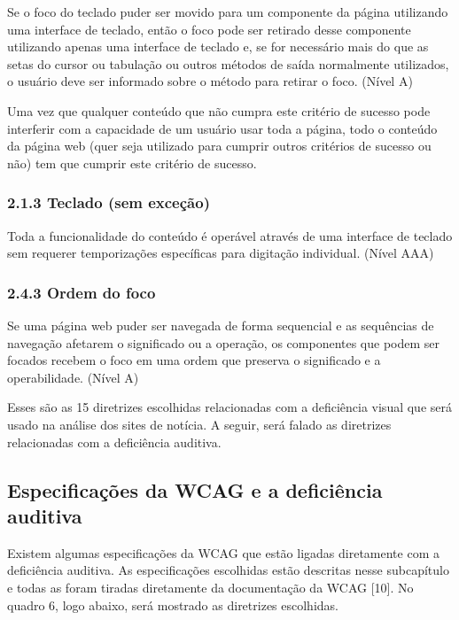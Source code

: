 \documentclass[a4paper]{article}
\begin{document}
\begin{titlepage}
Se o foco do teclado puder ser movido para um componente da página utilizando uma interface de teclado, então o foco pode ser retirado desse componente utilizando apenas uma interface de teclado e, se for necessário mais do que as setas do cursor ou tabulação ou outros métodos de saída normalmente utilizados, o usuário deve ser informado sobre o método para retirar o foco. (Nível A)

Uma vez que qualquer conteúdo que não cumpra este critério de sucesso pode interferir com a capacidade de um usuário usar toda a página, todo o conteúdo da página web (quer seja utilizado para cumprir outros critérios de sucesso ou não) tem que cumprir este critério de sucesso.

\subsubsection{2.1.3 Teclado (sem exceção)}

Toda a funcionalidade do conteúdo é operável através de uma interface de teclado sem requerer temporizações específicas para digitação individual. (Nível AAA)

\subsubsection{2.4.3 Ordem do foco}

Se uma página web puder ser navegada de forma sequencial e as sequências de navegação afetarem o significado ou a operação, os componentes que podem ser focados recebem o foco em uma ordem que preserva o significado e a operabilidade. (Nível A)

Esses são as 15 diretrizes escolhidas relacionadas com a deficiência visual que será usado na análise dos sites de notícia. A seguir, será falado as diretrizes relacionadas com a deficiência auditiva.

\subsection{Especificações da WCAG e a deficiência auditiva}

Existem algumas especificações  da WCAG que estão ligadas diretamente com a deficiência auditiva. As especificações escolhidas estão descritas nesse subcapítulo e todas as foram tiradas diretamente da documentação da WCAG [10]. No quadro 6, logo abaixo, será mostrado as diretrizes escolhidas.\\


\end{titlepage}
\end{document}
